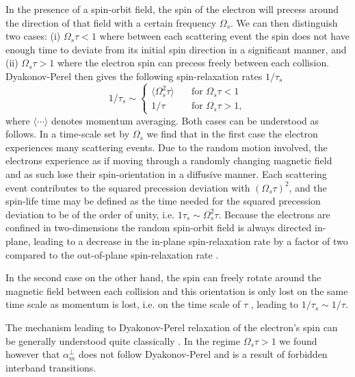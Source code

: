 In the presence of a spin-orbit field, the spin of the electron will precess around the direction of that field with a certain frequency $\Omega_s$. We can then distinguish two cases: (i) $\Omega_s \tau < 1$ where between each scattering event the spin does not have enough time to deviate from its initial spin direction in a significant manner, and (ii) $\Omega_s\tau>1$ where the electron spin can precess freely between each collision. 
Dyakonov-Perel then gives the following spin-relaxation rates $1/\tau_s$
\begin{equation}
	1/\tau_s \sim \begin{cases}
    	\langle \Omega^2_s\tau\rangle & \quad\text{for  } \Omega_s\tau < 1\\
        1/\tau  &\quad \text{for  }  \Omega_s\tau>1,
    \end{cases}
\end{equation}
where $\langle\cdots\rangle$ denotes momentum averaging. Both cases can be understood as follows. In a time-scale set by $\Omega_s$ we find that in the first case the electron experiences many scattering events. Due to the random motion involved, the electrons experience as if moving through a randomly changing magnetic field and as such lose their spin-orientation in a diffusive manner. Each scattering event contributes to the squared precession deviation with $(\Omega_s\tau)^2$, and the spin-life time may be defined as the time needed for the squared precession deviation to be of the order of unity, i.e. $1\tau_s\sim \Omega_s^2\tau$. Because the electrons are confined in two-dimensions the random spin-orbit field is always directed in-plane, leading to a decrease in the in-plane spin-relaxation rate by a factor of two compared to the out-of-plane spin-relaxation rate \cite{DYAKONOV1986, aronov_spin_1983, averkiev_spin_2002, burkov_theory_2004}. 

In the second case on the other hand, the spin can freely rotate around the magnetic field between each collision and this orientation is only lost on the same time scale as momentum is lost, i.e. on the time scale of $\tau$ \cite{aronov_spin_1983, dyakonov_spintronics_2004}, leading to $1/\tau_s \sim 1/\tau$.

The mechanism leading to Dyakonov-Perel relaxation of the electron's spin can be generally understood quite classically \cite{dyakonov_spintronics_2004}. In the regime $\Omega_s \tau > 1$ we found however that $\alpha_m^{\perp}$ does not follow Dyakonov-Perel and is a result of forbidden interband transitions. 

